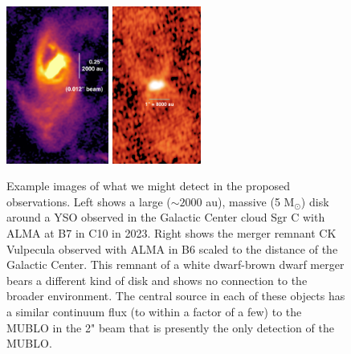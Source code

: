 \documentclass[12pt,a4paper]{article}  %
\newcommand{\msun}{\ensuremath{\mathrm{M}_\odot}\xspace}
\begin{document}
\begin{figure}
    \centering
    \includegraphics[width=0.30\textwidth]{figures/proposal_figures/sgrc_disk_zoom_scalebar.png}
    \includegraphics[width=0.26\textwidth]{figures/proposal_figures/CKVulcontinuum.png}
    \caption{Example images of what we might detect in the proposed observations.
    Left shows a large ($\sim2000$ au), massive (5 \msun) disk around a YSO \citep{Lu2022} observed in the Galactic Center cloud Sgr C with ALMA at B7 in C10 in 2023.
    Right shows the merger remnant CK Vulpecula \citep{Eyres2018} observed with ALMA in B6 scaled to the distance of the Galactic Center. 
    This remnant of a white dwarf-brown dwarf merger bears a different kind of disk and shows no connection to the broader environment.
    The central source in each of these objects has a similar continuum flux (to within a factor of a few) to the MUBLO in the 2" beam that is presently the only detection of the MUBLO.
    }
    \label{fig:whatwecouldsee}
\end{figure}



{}



\end{document}
